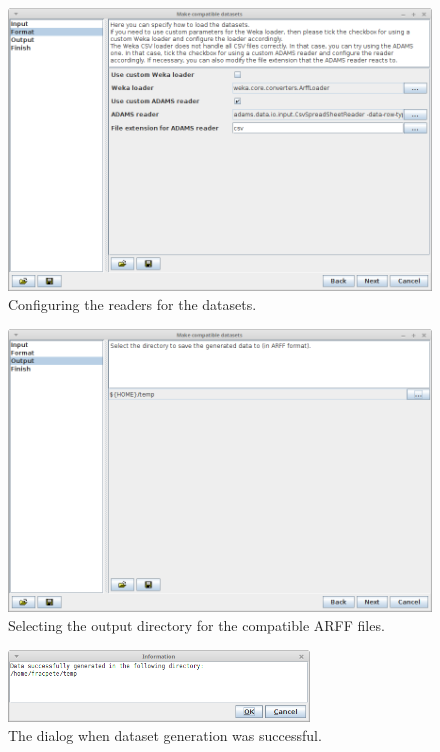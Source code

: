 \begin{figure}[htb]
  \centering
  \includegraphics[width=12.0cm]{images/makecompatible2.png}
  \caption{Configuring the readers for the datasets.}
  \label{makecompatible2}
\end{figure}

\begin{figure}[htb]
  \centering
  \includegraphics[width=12.0cm]{images/makecompatible3.png}
  \caption{Selecting the output directory for the compatible ARFF files.}
  \label{makecompatible3}
\end{figure}

\begin{figure}[htb]
  \centering
  \includegraphics[width=8.0cm]{images/makecompatible4.png}
  \caption{The dialog when dataset generation was successful.}
  \label{makecompatible4}
\end{figure}

